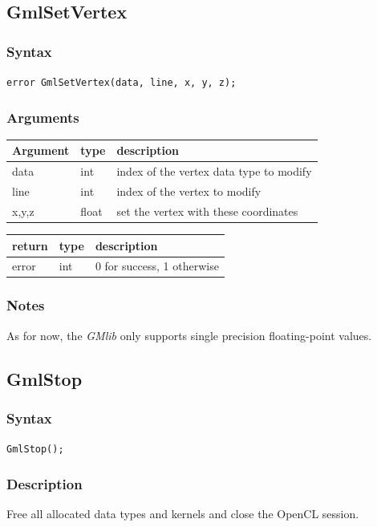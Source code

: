 \documentclass[a4paper,12pt]{article}
\begin{document}
\subsection{GmlSetVertex}
\subsubsection*{Syntax}
{\tt error GmlSetVertex(data, line, x, y, z);}
\subsubsection*{Arguments}

\begin{tabular}{|m{2cm}|m{1.5cm}|m{10.5cm}|}
\hline
Argument   & type   & description \\
\hline
data       & int    & index of the vertex data type to modify \\
\hline
line       & int    & index of the vertex to modify \\
\hline
x,y,z      & float  & set the vertex with these coordinates \\
\hline
\end{tabular}

\medskip

\begin{tabular}{|m{2cm}|m{1.5cm}|m{10.5cm}|}
\hline
return     & type   & description \\
\hline
error     & int    & 0 for success, 1 otherwise \\
\hline
\end{tabular}
\subsubsection*{Notes}
As for now, the \emph{GMlib} only supports single precision floating-point values.


\subsection{GmlStop}
\subsubsection*{Syntax}

{\tt GmlStop();}
\subsubsection*{Description}

Free all allocated data types and kernels and close the OpenCL session.
\end{document}
